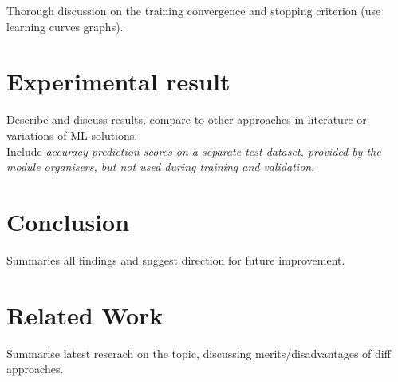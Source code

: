 \documentclass[conference]{IEEEtran}
\begin{document}


Thorough discussion on the training convergence and stopping criterion (use learning curves graphs).\\

\section{Experimental result} \label{s-exp-res}

Describe and discuss results, compare to other approaches in literature or variations of ML solutions.\\

Include \textit{accuracy prediction scores on a separate test dataset, provided by the module organisers, but not used during training and validation}.\\

\section{Conclusion} \label{s-concl}

Summaries all findings and suggest direction for future improvement.\\

\section{Related Work} \label{s-rel-work}

Summarise latest reserach on the topic, discussing merits/disadvantages of diff approaches.\\




\end{document}
